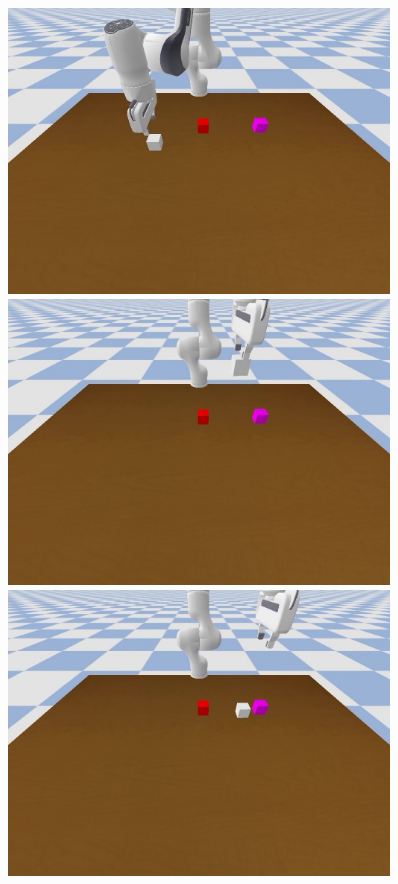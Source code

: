 \begin{figure}
    \centering
    \begin{minipage}{0.3\textwidth}
\includegraphics[trim={6cm 9cm 6cm 0},clip,width=0.9\textwidth]{assets/error-0.jpg}
    \end{minipage}
\begin{minipage}{0.3\textwidth}        \includegraphics[trim={6cm 9cm 6cm 0},clip,width=0.9\textwidth]{assets/error-2.jpg}
    \end{minipage}
\begin{minipage}{0.3\textwidth}        \includegraphics[trim={6cm 9cm 6cm 0},clip,width=0.9\textwidth]{assets/error-3.jpg}

\end{minipage}
\end{figure}
